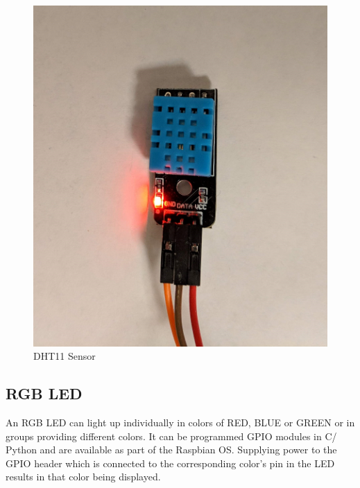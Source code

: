 \documentclass[11pt,openright]{report}
\begin{document}
\begin{figure}
	\centering
	\includegraphics[scale=0.1]{images/dht11.jpg}
	\caption{DHT11 Sensor}
	\label{fig:dht11}
\end{figure}

\subsection{RGB LED}
An RGB LED can light up individually in colors of RED, BLUE or GREEN or in groups providing different colors. It can be programmed GPIO modules in C/ Python and are available as part of the Raspbian OS. Supplying power to the GPIO header which is connected to the corresponding color’s pin in the LED results in that color being displayed.
\end{document}
